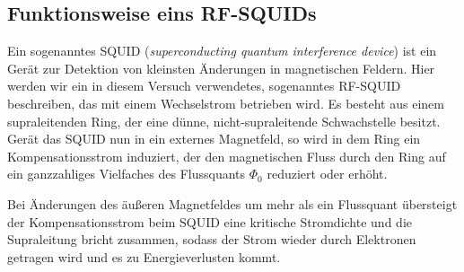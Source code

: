\documentclass[a4paper,ngerman]{scrartcl}
\begin{document}





\FloatBarrier
\subsection{Funktionsweise eins RF-SQUIDs}
Ein sogenanntes SQUID (\emph{superconducting quantum interference device}) 
ist ein Gerät zur Detektion von kleinsten Änderungen in
magnetischen Feldern. 
Hier werden wir ein  in diesem Versuch verwendetes, sogenanntes RF-SQUID beschreiben, 
das mit einem Wechselstrom betrieben wird.
Es besteht aus einem supraleitenden Ring, der eine dünne, nicht-supraleitende Schwachstelle besitzt. 
Gerät das SQUID nun in ein externes Magnetfeld,
so wird in dem Ring ein Kompensationsstrom induziert,
der den magnetischen Fluss durch den Ring auf ein ganzzahliges 
Vielfaches des Flussquants $\Phi_0$ reduziert oder erhöht.

Bei Änderungen des äußeren Magnetfeldes um mehr als ein Flussquant übersteigt der Kompensationsstrom beim SQUID eine kritische Stromdichte und die Supraleitung bricht zusammen, 
sodass der Strom wieder durch Elektronen getragen wird und es zu 
Energieverlusten kommt.
\end{document}
